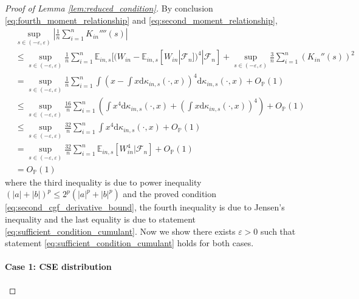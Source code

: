 \documentclass[12pt]{article}
\theoremstyle{definition}
\def\P{\mathbb{P}}
\def\P{\mathbb{P}}
\newcommand{\E}{\mathbb E}								%
\renewcommand{\P}{\mathbb{P}}							%
\begin{document}
\begin{proof}[Proof of Lemma \ref{lem:reduced_condition}]
	By conclusion \eqref{eq:fourth_moment_relationship} and \eqref{eq:second_moment_relationship},
	\begin{align*}
		&
		\sup_{s\in (-\varepsilon,\varepsilon)}\left|\frac{1}{n}\sum_{i=1}^n K_{in}''''(s)\right|\\
		&
		\leq \sup_{s\in (-\varepsilon,\varepsilon)}\frac{1}{n}\sum_{i=1}^n\E_{in,s}[(W_{in}-\E_{in,s}[W_{in}|\mathcal{F}_n])^4|\mathcal{F}_n]+\sup_{s\in(-\varepsilon,\varepsilon)}\frac{3}{n}\sum_{i=1}^n (K_{in}''(s))^2\\
		&
		=\sup_{s\in (-\varepsilon,\varepsilon)}\frac{1}{n}\sum_{i=1}^n \int \left(x-\int x\mathrm{d}\kappa_{in,s}(\cdot,x)\right)^4\mathrm{d}\kappa_{in,s}(\cdot,x)+O_{\P}(1)\\
		&
		\leq \sup_{s\in (-\varepsilon,\varepsilon)}\frac{16}{n}\sum_{i=1}^n \left(\int x^4\mathrm{d}\kappa_{in,s}(\cdot,x)+\left(\int x\mathrm{d}\kappa_{in,s}(\cdot,x)\right)^4\right)+O_{\P}(1)\\
		&
		\leq \sup_{s\in (-\varepsilon,\varepsilon)}\frac{32}{n}\sum_{i=1}^n \int x^4\mathrm{d}\kappa_{in,s}(\cdot,x)+O_{\P}(1)\\
		&
		=\sup_{s\in (-\varepsilon,\varepsilon)}\frac{32}{n}\sum_{i=1}^n \E_{in,s}[W_{in}^4|\mathcal{F}_n]+O_{\P}(1)\\
		&
		=O_{\P}(1)
	\end{align*}
	where the third inequality is due to power inequality $(|a|+|b|)^p\leq 2^p (|a|^p+|b|^p)$ and the proved condition \eqref{eq:second_cgf_derivative_bound}, the fourth inequality is due to Jensen's inequality and the last equality is due to statement \eqref{eq:sufficient_condition_cumulant}. Now we show there exists $\varepsilon>0$ such that statement \eqref{eq:sufficient_condition_cumulant} holds for both cases.


	\paragraph{Case 1: CSE distribution}


\end{proof}
\end{document}
